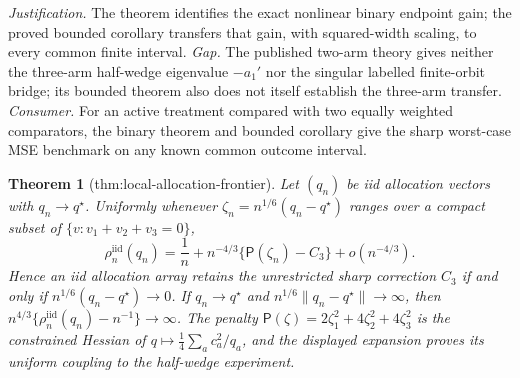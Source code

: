 \documentclass{article}
\newtheorem{theorem}{Theorem}
\begin{document}
\par\smallskip\noindent \textit{Justification.} The theorem identifies the exact nonlinear binary endpoint gain; the proved bounded corollary transfers that gain, with squared-width scaling, to every common finite interval. \textit{Gap.} The published two-arm theory gives neither the three-arm half-wedge eigenvalue \(-a_1'\) nor the singular labelled finite-orbit bridge; its bounded theorem also does not itself establish the three-arm transfer. \textit{Consumer.} For an active treatment compared with two equally weighted comparators, the binary theorem and bounded corollary give the sharp worst-case MSE benchmark on any known common outcome interval.

\begin{theorem}[thm:local-allocation-frontier]\label{thm:local-allocation-frontier}
Let \((q_n)\) be iid allocation vectors with \(q_n\to q^\star\). Uniformly whenever \(\zeta_n=n^{1/6}(q_n-q^\star)\) ranges over a compact subset of \(\{v:v_1+v_2+v_3=0\}\), \[\rho_n^{\mathrm{iid}}(q_n)=\frac1n+n^{-4/3}\{\mathsf P(\zeta_n)-C_3\}+o(n^{-4/3}).\] Hence an iid allocation array retains the unrestricted sharp correction \(C_3\) if and only if \(n^{1/6}(q_n-q^\star)\to0\). If \(q_n\to q^\star\) and \(n^{1/6}\|q_n-q^\star\|\to\infty\), then \(n^{4/3}\{\rho_n^{\mathrm{iid}}(q_n)-n^{-1}\}\to\infty\). The penalty \(\mathsf P(\zeta)=2\zeta_1^2+4\zeta_2^2+4\zeta_3^2\) is the constrained Hessian of \(q\mapsto\frac14\sum_ac_a^2/q_a\), and the displayed expansion proves its uniform coupling to the half-wedge experiment.
\end{theorem}
\end{document}
